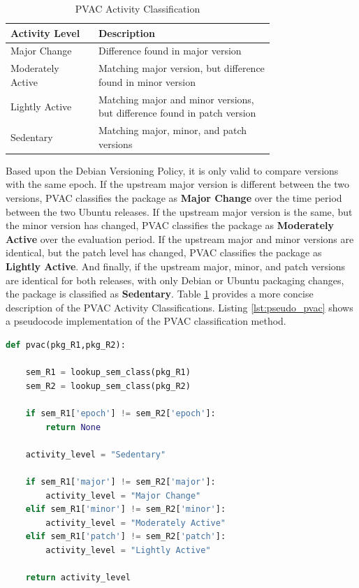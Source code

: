 \documentclass[sn-mathphys-num]{sn-jnl}%
\theoremstyle{thmstyleone}%
\theoremstyle{thmstyletwo}%
\theoremstyle{thmstylethree}%
\begin{document}
\begin{table}[h]
    \centering
    \begin{tabular}{p{0.25\linewidth} p{0.5\linewidth}}
    \toprule
         Activity Level & Description \\ 
    \toprule
         Major Change & Difference found in major version\\
         Moderately Active & Matching major version, but difference found in minor version \\ 
         Lightly Active & Matching major and minor versions, but difference found in patch version \\ 
         Sedentary & Matching major, minor, and patch versions \\ 
        \bottomrule
    \end{tabular}
    \caption{PVAC Activity Classification}
    \label{tab:pvac_activity_classificaiton}
\end{table}

Based upon the Debian Versioning Policy, it is only valid to compare versions with the same epoch. If the upstream major version is different between the two versions, PVAC classifies the package as \textbf{Major Change} over the time period between the two Ubuntu releases. If the upstream major version is the same, but the minor version has changed, PVAC classifies the package as \textbf{Moderately Active} over the evaluation period. If the upstream major and minor versions are identical, but the patch level has changed, PVAC classifies the package as \textbf{Lightly Active}.  And finally, if the upstream major, minor, and patch versions are identical for both releases, with only Debian or Ubuntu packaging changes, the package is classified as \textbf{Sedentary}. Table \ref{tab:pvac_activity_classificaiton} provides a more concise description of the PVAC Activity Classifications. Listing \ref{lst:pseudo_pvac} shows a pseudocode implementation of the PVAC classification method.

\begin{lstlisting}[language={Python}, caption={Pseudocode implementation of PVAC}, label={lst:pseudo_pvac}]
def pvac(pkg_R1,pkg_R2):

    sem_R1 = lookup_sem_class(pkg_R1)
    sem_R2 = lookup_sem_class(pkg_R2)
    
    if sem_R1['epoch'] != sem_R2['epoch']:
        return None
    
    activity_level = "Sedentary"
    
    if sem_R1['major'] != sem_R2['major']:
        activity_level = "Major Change"
    elif sem_R1['minor'] != sem_R2['minor']:
        activity_level = "Moderately Active"
    elif sem_R1['patch'] != sem_R2['patch']:
        activity_level = "Lightly Active"

    return activity_level
\end{lstlisting}
\end{document}

